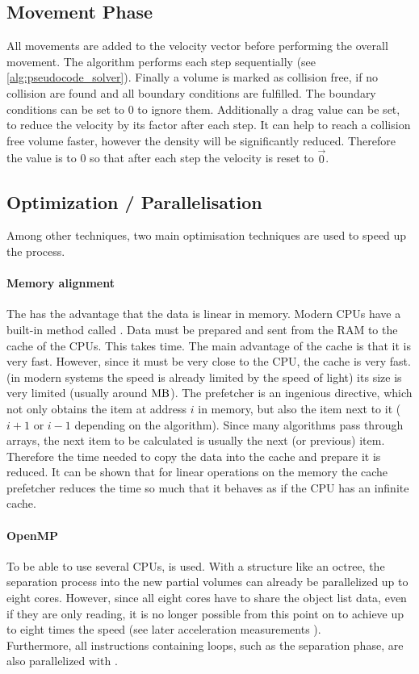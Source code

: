 \subsection{Movement Phase}
All movements are added to the velocity vector before performing the overall movement.
The algorithm performs each step sequentially (see \cref{alg:pseudocode_solver}).
% 
Finally a volume is marked as collision free, if no collision are found and all boundary conditions are fulfilled. 
The boundary conditions can be set to 0 to ignore them.
Additionally a drag value can be set, to reduce the velocity by its factor after each step.
It can help to reach a collision free volume faster, however the density will be significantly reduced.
Therefore the value is to 0 so that after each step the velocity is reset to $\vec{0}$. 
% 
\subsection{Optimization / Parallelisation}\label{sec:modelOpt}
% 
Among other techniques, two main optimisation techniques are used to speed up the process.
% 
\paragraph{Memory alignment}
The  has the advantage that the data is linear in memory.
Modern \acp{CPU} have a built-in method called .
Data must be prepared and sent from the \ac{RAM} to the cache of the \acp{CPU}.
This takes time.
The main advantage of the cache is that it is very fast.
However, since it must be very close to the \ac{CPU}, the cache is very fast. (in modern systems the speed is already limited by the speed of light) its size is very limited (usually around $\si{\mega\byte}$).
The prefetcher is an ingenious directive, which not only obtains the item at address $i$ in memory, but also the item next to it ($i+1$ or $i-1$ depending on the algorithm).
Since many algorithms pass through arrays, the next item to be calculated is usually the next (or previous) item.
Therefore the time needed to copy the data into the cache and prepare it is reduced.
It can be shown that for linear operations on the memory the cache prefetcher reduces the time so much that it behaves as if the \ac{CPU} has an infinite cache.
% 
\paragraph{OpenMP}
% 
To be able to use several \acp{CPU}, \openmp is used. With a structure like an octree, the separation process into the new partial volumes can already be parallelized up to eight cores.
However, since all eight cores have to share the object list data, even if they are only reading, it is no longer possible from this point on to achieve up to eight times the speed (see later acceleration measurements \dummy{}).
\\
% 
Furthermore, all instructions containing loops, such as the separation phase, are also parallelized with \openmp.
% 
% 
% 

